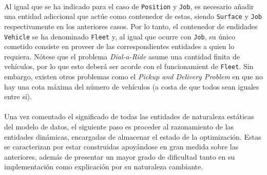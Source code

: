 \documentclass{subfiles}
\begin{document}
          \paragraph{}
          Al igual que se ha indicado para el caso de \texttt{Position} y \texttt{Job}, es necesario añadir una entidad adiccional que actúe como contenedor de estas, siendo \texttt{Surface} y \texttt{Job} respectivamente en los anteriores casos. Por lo tanto, el contenedor de endidades \texttt{Vehicle} se ha denominado \texttt{Fleet} y, al igual que ocurre con \texttt{Job}, su único cometido consiste en proveer de las correspondientes entidades a quien lo requiera. Nótese que el problema \emph{Dial-a-Ride} asume una cantidad finita de vehículos, por lo que esto deberá ser acorde con el funcionamient de \texttt{Fleet}. Sin embargo, existen otros problemas como el \emph{Pickup and Delivery Problem} en que no hay una cota máxima del número de vehículos (a costa de que todos sean iguales entre sí).

          \paragraph{}
          Una vez comentado el significado de todas las entidades de naturaleza estáticas del modelo de datos, el siguiente paso es proceder al razonamiento de las entidades dinámicas, encargadas de almacenar el estado de la optimización. Estas se caracterizan por estar construidas apoyándose en gran medida sobre las anteriores, además de presentar un mayor grado de dificultad tanto en su implementación como explicación por su naturaleza cambiante.
\end{document}
